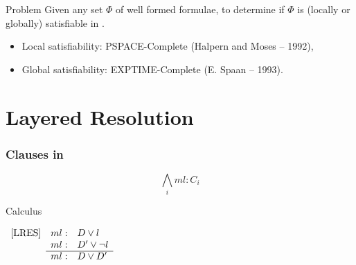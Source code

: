 \documentclass[10pt]{beamer}
\begin{document}
\begin{frame}{Problem}
    Given any set $\Phi$ of well formed formulae, to determine if $\Phi$ is
    (locally or globally) satisfiable in .

    \begin{itemize}[<+- | visible@+(1)->]
        \item Local satisfiability: PSPACE-Complete (Halpern and Moses -- 1992),
        \item Global satisfiability: EXPTIME-Complete (E. Spaan -- 1993).
    \end{itemize} 
    
\end{frame}

\section{Layered Resolution}
\begin{frame}
    \frametitle{Clauses in } 
    {\Large
        \begin{center}
        \begin{equation*} \bigwedge_i ml: C_i \end{equation*}
        \end{center}
    }
    \begin{itemize} 
    \end{itemize} 

\end{frame}

\begin{frame}{Calculus}
\begin{center}
$
\begin{array}{lrl}
\mbox{[LRES]} &ml: & D \lor l\\
 &ml: & D' \lor \neg l\\  \cline{2-3}
    &ml: & D \lor D'
\end{array}
$
\end{center}
\end{frame}
\end{document}
